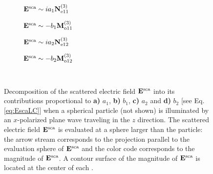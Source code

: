 \begin{figure}[h!]
	\def\svgwidth{1\textwidth} \small
  \vspace*{3.0em}
  \hspace*{0.em}
    \begin{subfigure}{.24\textwidth}\caption{\centering $\vb{E}^\text{sca} \sim  i a_1 \vb{N}^{(3)}_{\text{e}11}$}\label{fig:VSH:a1}\end{subfigure}
  	\begin{subfigure}{.24\textwidth}\caption{\centering $\vb{E}^\text{sca} \sim  - b_1 \vb{M}^{(3)}_{\text{o}11}$}\label{fig:VSH:b1}\end{subfigure}
	\begin{subfigure}{.24\textwidth}\caption{\centering $\vb{E}^\text{sca} \sim  i a_2 \vb{N}^{(3)}_{\text{e}12}$}\label{fig:VSH:a2}\end{subfigure}
	\begin{subfigure}{.24\textwidth}\caption{\centering $\vb{E}^\text{sca} \sim  - b_2 \vb{M}^{(3)}_{\text{o}12}$}\label{fig:VSH:b2}\end{subfigure}
  \vspace*{-6.em}\\
  \vspace*{-2em}
  \caption[Multipolar Contributions to the Scattered Electric Field]{ Decomposition of the  scattered electric field $\vb{E}^\text{sca}$ into its contributions  proportional to \textbf{a)} $a_1$,  \textbf{b)}  $b_1$, \textbf{c)} $a_2$ and \textbf{d)} $b_2$ [see Eq. \eqref{eq:EscaLC}] when a spherical particle (not shown) is illuminated by an $x$-polarized plane wave traveling in the $z$ direction. The scattered electric field $\vb{E}^\text{sca}$ is evaluated at a sphere larger than the particle: the arrow stream corresponds to the projection parallel to the evaluation sphere of $\vb{E}^\text{sca}$  and the color code corresponds to the magnitude of  $\vb{E}^\text{sca}$. A contour surface of the magnitude of $\vb{E}^\text{sca}$ is located at the center of each \textcolor{coordinated system}. }
\label{fig:Multipoles}
\end{figure}

